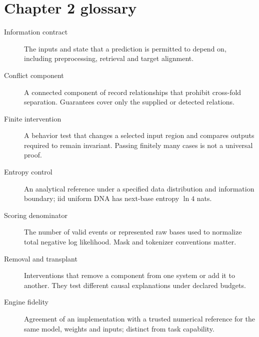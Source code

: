 \chapter*{Chapter 2 glossary}
\begin{description}
\item[Information contract] The inputs and state that a prediction is permitted to depend on, including preprocessing, retrieval and target alignment.
\item[Conflict component] A connected component of record relationships that prohibit cross-fold separation. Guarantees cover only the supplied or detected relations.
\item[Finite intervention] A behavior test that changes a selected input region and compares outputs required to remain invariant. Passing finitely many cases is not a universal proof.
\item[Entropy control] An analytical reference under a specified data distribution and information boundary; iid uniform DNA has next-base entropy $\ln4$ nats.
\item[Scoring denominator] The number of valid events or represented raw bases used to normalize total negative log likelihood. Mask and tokenizer conventions matter.
\item[Removal and transplant] Interventions that remove a component from one system or add it to another. They test different causal explanations under declared budgets.
\item[Engine fidelity] Agreement of an implementation with a trusted numerical reference for the same model, weights and inputs; distinct from task capability.
\end{description}
